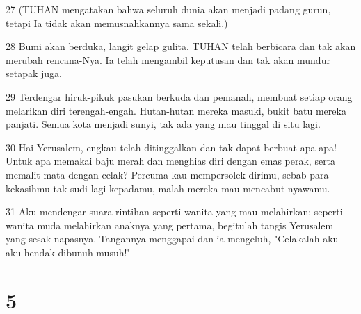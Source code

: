 \par 27 (TUHAN mengatakan bahwa seluruh dunia akan menjadi padang gurun, tetapi Ia tidak akan memusnahkannya sama sekali.)
\par 28 Bumi akan berduka, langit gelap gulita. TUHAN telah berbicara dan tak akan merubah rencana-Nya. Ia telah mengambil keputusan dan tak akan mundur setapak juga.
\par 29 Terdengar hiruk-pikuk pasukan berkuda dan pemanah, membuat setiap orang melarikan diri terengah-engah. Hutan-hutan mereka masuki, bukit batu mereka panjati. Semua kota menjadi sunyi, tak ada yang mau tinggal di situ lagi.
\par 30 Hai Yerusalem, engkau telah ditinggalkan dan tak dapat berbuat apa-apa! Untuk apa memakai baju merah dan menghias diri dengan emas perak, serta memalit mata dengan celak? Percuma kau mempersolek dirimu, sebab para kekasihmu tak sudi lagi kepadamu, malah mereka mau mencabut nyawamu.
\par 31 Aku mendengar suara rintihan seperti wanita yang mau melahirkan; seperti wanita muda melahirkan anaknya yang pertama, begitulah tangis Yerusalem yang sesak napasnya. Tangannya menggapai dan ia mengeluh, "Celakalah aku--aku hendak dibunuh musuh!"

\chapter{5}


